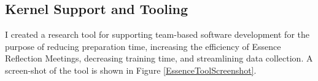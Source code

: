 \documentclass[preprint,12pt,3p]{elsarticle}
\begin{document}
%
%

\subsection{Kernel Support and Tooling}
\label{EssenceTool}
I created a research tool for supporting team-based software development for the purpose of reducing preparation time, increasing the efficiency of Essence Reflection Meetings, decreasing training time, and streamlining data collection. A screen-shot of the tool is shown in Figure \ref{EssenceToolScreenshot}. 
\end{document}
